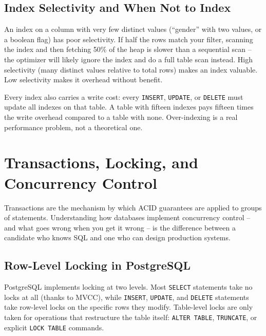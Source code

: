 \documentclass[11pt,a4paper]{article}
\begin{document}
\subsection{Index Selectivity and When Not to Index}

An index on a column with very few distinct values (``gender'' with two values, or a boolean flag) has poor selectivity. If half the rows match your filter, scanning the index and then fetching 50\% of the heap is slower than a sequential scan -- the optimizer will likely ignore the index and do a full table scan instead. High selectivity (many distinct values relative to total rows) makes an index valuable. Low selectivity makes it overhead without benefit.

Every index also carries a write cost: every \texttt{INSERT}, \texttt{UPDATE}, or \texttt{DELETE} must update all indexes on that table. A table with fifteen indexes pays fifteen times the write overhead compared to a table with none. Over-indexing is a real performance problem, not a theoretical one.

\newpage

\section{Transactions, Locking, and Concurrency Control}

Transactions are the mechanism by which ACID guarantees are applied to groups of statements. Understanding how databases implement concurrency control -- and what goes wrong when you get it wrong -- is the difference between a candidate who knows SQL and one who can design production systems.

\subsection{Row-Level Locking in PostgreSQL}

PostgreSQL implements locking at two levels. Most \texttt{SELECT} statements take no locks at all (thanks to MVCC), while \texttt{INSERT}, \texttt{UPDATE}, and \texttt{DELETE} statements take row-level locks on the specific rows they modify. Table-level locks are only taken for operations that restructure the table itself: \texttt{ALTER TABLE}, \texttt{TRUNCATE}, or explicit \texttt{LOCK TABLE} commands.
\end{document}
